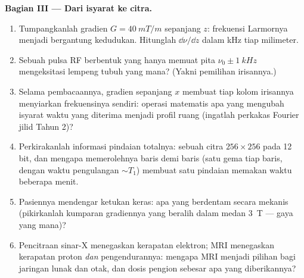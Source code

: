 \begin{problem}
\medskip\noindent\textbf{Bagian III --- Dari isyarat ke citra.}
\begin{enumerate}[resume]
  \item Tumpangkanlah gradien $G = \qty{40}{mT/m}$ sepanjang $z$:
        frekuensi Larmornya menjadi bergantung kedudukan. Hitunglah
        $\dd\nu/\dd z$ dalam kHz tiap milimeter.
  \item Sebuah pulsa RF berbentuk yang hanya memuat pita $\nu_0 \pm
        \qty{1}{kHz}$ mengeksitasi lempeng tubuh yang mana? (Yakni
        pemilihan irisannya.)
  \item Selama pembacaannya, gradien sepanjang $x$ membuat tiap kolom
        irisannya menyiarkan frekuensinya sendiri: operasi matematis apa
        yang mengubah isyarat waktu yang diterima menjadi profil ruang
        (ingatlah perkakas Fourier jilid Tahun 2)?
  \item Perkirakanlah informasi pindaian totalnya: sebuah citra
        $256 \times 256$ pada 12 bit, dan mengapa memerolehnya baris
        demi baris (satu gema tiap baris, dengan waktu pengulangan
        $\sim T_1$) membuat satu pindaian memakan waktu beberapa menit.
  \item Pasiennya mendengar ketukan keras: apa yang berdentam secara
        mekanis (pikirkanlah kumparan gradiennya yang beralih dalam
        medan \qty{3}{T} --- gaya yang mana)?
  \item Pencitraan sinar-X menegaskan kerapatan elektron; MRI menegaskan
        kerapatan proton \emph{dan} pengendurannya: mengapa MRI menjadi
        pilihan bagi jaringan lunak dan otak, dan dosis pengion sebesar
        apa yang diberikannya?
\end{enumerate}


\end{problem}
